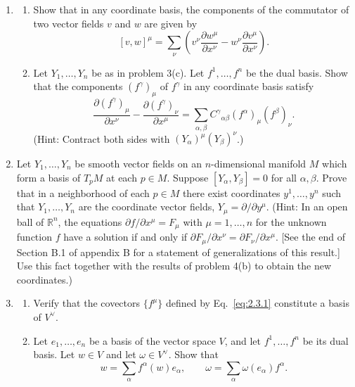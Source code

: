 \begin{enumerate}[label=\arabic*., leftmargin=*]
  \item
  \begin{enumerate}[label=\alph*)]
    \item Show that in any coordinate basis, the components of the commutator of
      two vector fields \(v\) and \(w\) are given by
      \[
        [v,w]^\mu=\sum_\nu\left(
        v^\nu\frac{\partial w^\mu}{\partial x^\nu}
        -w^\nu\frac{\partial v^\mu}{\partial x^\nu}\right) .
      \]

    \item Let \(Y_1,\ldots,Y_n\) be as in problem 3(c).  Let
      \(f^{1},\ldots,f^{n}\) be the dual basis.  Show that the components
      \((f^{\gamma})_\mu\) of \(f^{\gamma}\) in any coordinate basis satisfy
      \[
        \frac{\partial(f^{\gamma})_\mu}{\partial x^\nu}
        -\frac{\partial(f^{\gamma})_\nu}{\partial x^\mu}
        =\sum_{\alpha,\beta}C^\gamma{}_{\alpha\beta}
        (f^{\alpha})_\mu(f^{\beta})_\nu .
      \]
      (Hint: Contract both sides with \((Y_\alpha)^\mu(Y_\beta)^\nu\).)
  \end{enumerate}

  \item Let \(Y_1,\ldots,Y_n\) be smooth vector fields on an \(n\)-dimensional
  manifold \(M\) which form a basis of \(T_pM\) at each \(p\in M\).  Suppose
  \([Y_\alpha,Y_\beta]=0\) for all \(\alpha,\beta\).  Prove that in a neighborhood
  of each \(p\in M\) there exist coordinates \(y^1,\ldots,y^n\) such that
  \(Y_1,\ldots,Y_n\) are the coordinate vector fields,
  \(Y_\mu=\partial/\partial y^\mu\).  (Hint: In an open ball of \(\mathbb{R}^n\),
  the equations \(\partial f/\partial x^\mu=F_\mu\) with
  \(\mu=1,\ldots,n\) for the unknown function \(f\) have a solution if and only
  if \(\partial F_\mu/\partial x^\nu=\partial F_\nu/\partial x^\mu\).  [See the
  end of Section B.1 of appendix B for a statement of generalizations of this
  result.]  Use this fact together with the results of problem 4(b) to obtain the new
  coordinates.)

  \item
  \begin{enumerate}[label=\alph*)]
    \item Verify that the covectors \(\{f^{\mu}\}\) defined by
      Eq.~\eqref{eq:2.3.1} constitute a basis of \(V^\vee\).

    \item Let \(e_1,\ldots,e_n\) be a basis of the vector space \(V\), and let
      \(f^{1},\ldots,f^{n}\) be its dual basis.  Let \(w\in V\) and let
      \(\omega\in V^\vee\).  Show that
      \[
        w=\sum_\alpha f^{\alpha}(w)e_\alpha ,
        \qquad
        \omega=\sum_\alpha\omega(e_\alpha)f^{\alpha} .
      \]


\end{enumerate}
\end{enumerate}
